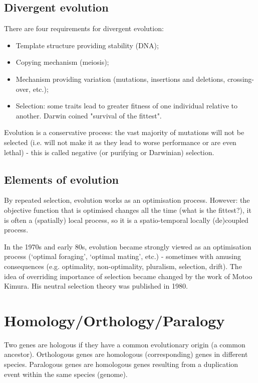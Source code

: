 \subsection{Divergent evolution}

There are four requirements for divergent evolution:

\begin{itemize}
\item Template structure providing stability (DNA);
\item Copying mechanism (meiosis);
\item Mechanism providing variation (mutations, insertions and deletions,
crossing-over, etc.);
\item Selection: some traits lead to greater fitness of one individual
relative to another. Darwin coined "survival of the fittest".
\end{itemize}

Evolution is a conservative process: the vast majority of mutations will not
be selected (i.e. will not make it as they lead to worse performance or are
even lethal) - this is called negative (or purifying or Darwinian) selection.

\subsection{Elements of evolution}

By repeated selection, evolution works as an optimisation process. However:
the objective function that is optimised changes all the time (what is the
fittest?), it is often a (spatially) local process, so it is a spatio-temporal
locally (de)coupled process.

In the 1970s and early 80s, evolution became strongly viewed as an optimisation
process (`optimal foraging', `optimal mating', etc.) - sometimes with amusing
consequences (e.g. optimality, non-optimality, pluralism, selection, drift).
The idea of overriding importance of selection became changed by the work of
Motoo Kimura. His neutral selection theory was published in 1980.

\section{Homology/Orthology/Paralogy}

Two genes are hologous if they have a common evolutionary origin (a common
ancestor). Orthologous genes are homologous (corresponding) genes in different
species. Paralogous genes are homologous genes resulting from a duplication
event within the same species (genome).


